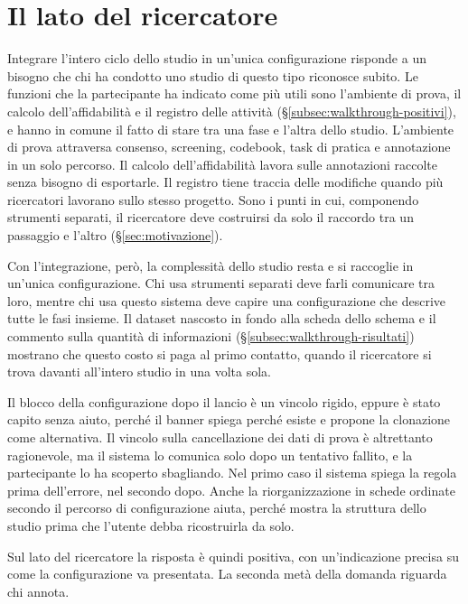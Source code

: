 \documentclass[]{sapthesis}
\begin{document}
\section{Il lato del ricercatore}
\label{sec:disc-ricercatore}

Integrare l'intero ciclo dello studio in un'unica configurazione risponde a un bisogno che chi ha condotto uno studio di questo tipo riconosce subito. Le funzioni che la partecipante ha indicato come più utili sono l'ambiente di prova, il calcolo dell'affidabilità e il registro delle attività (\S\ref{subsec:walkthrough-positivi}), e hanno in comune il fatto di stare tra una fase e l'altra dello studio. L'ambiente di prova attraversa consenso, screening, codebook, task di pratica e annotazione in un solo percorso. Il calcolo dell'affidabilità lavora sulle annotazioni raccolte senza bisogno di esportarle. Il registro tiene traccia delle modifiche quando più ricercatori lavorano sullo stesso progetto. Sono i punti in cui, componendo strumenti separati, il ricercatore deve costruirsi da solo il raccordo tra un passaggio e l'altro (\S\ref{sec:motivazione}).

Con l'integrazione, però, la complessità dello studio resta e si raccoglie in un'unica configurazione. Chi usa strumenti separati deve farli comunicare tra loro, mentre chi usa questo sistema deve capire una configurazione che descrive tutte le fasi insieme. Il dataset nascosto in fondo alla scheda dello schema e il commento sulla quantità di informazioni (\S\ref{subsec:walkthrough-risultati}) mostrano che questo costo si paga al primo contatto, quando il ricercatore si trova davanti all'intero studio in una volta sola.

Il blocco della configurazione dopo il lancio è un vincolo rigido, eppure è stato capito senza aiuto, perché il banner spiega perché esiste e propone la clonazione come alternativa. Il vincolo sulla cancellazione dei dati di prova è altrettanto ragionevole, ma il sistema lo comunica solo dopo un tentativo fallito, e la partecipante lo ha scoperto sbagliando. Nel primo caso il sistema spiega la regola prima dell'errore, nel secondo dopo. Anche la riorganizzazione in schede ordinate secondo il percorso di configurazione aiuta, perché mostra la struttura dello studio prima che l'utente debba ricostruirla da solo.

Sul lato del ricercatore la risposta è quindi positiva, con un'indicazione precisa su come la configurazione va presentata. La seconda metà della domanda riguarda chi annota.
\end{document}
